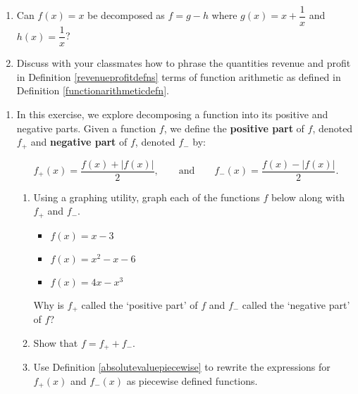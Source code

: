 \documentclass{ximera}
\begin{document}
\begin{enumerate}
\setcounter{enumi}{\value{HW}}

\item    Can $f(x) = x$ be decomposed as $f = g-h$ where $g(x) = x+\dfrac{1}{x}$ and $h(x) = \dfrac{1}{x}$?

\item   Discuss with your classmates how to phrase the quantities revenue and profit in Definition \ref{revenueprofitdefns} terms of function arithmetic as defined in Definition \ref{functionarithmeticdefn}.
 
\setcounter{HW}{\value{enumi}}
\end{enumerate}



\begin{enumerate}
\setcounter{enumi}{\value{HW}}

\item \label{posnegdecompexercise}  In this exercise, we explore decomposing a function into its positive and negative parts.  Given a function $f$, we define the \textbf{positive part} of $f$, denoted $f_{+}$ and \textbf{negative part} of $f$, denoted $f_{-}$ by:

\[ f_{+}(x) = \dfrac{f(x) + |f(x)|}{2}, \qquad \text{and} \qquad f_{-}(x) = \dfrac{f(x) - |f(x)|}{2}. \]

\begin{enumerate}

\item Using a graphing utility, graph each of the functions $f$ below along with $f_{+}$ and $f_{-}$.


\begin{itemize}

\item  $f(x) = x-3$

\item  $f(x) = x^2-x-6$

\item  $f(x) = 4x-x^3$

\end{itemize}


Why is $f_{+}$ called the `positive part' of $f$ and $f_{-}$ called the `negative part' of $f$?

\item Show that $f = f_{+} + f_{-}$.

\item Use Definition \ref{absolutevaluepiecewise} to rewrite the expressions for $f_{+}(x)$ and $f_{-}(x)$ as piecewise defined functions.

\end{enumerate}  

\setcounter{HW}{\value{enumi}}
\end{enumerate}
\end{document}
